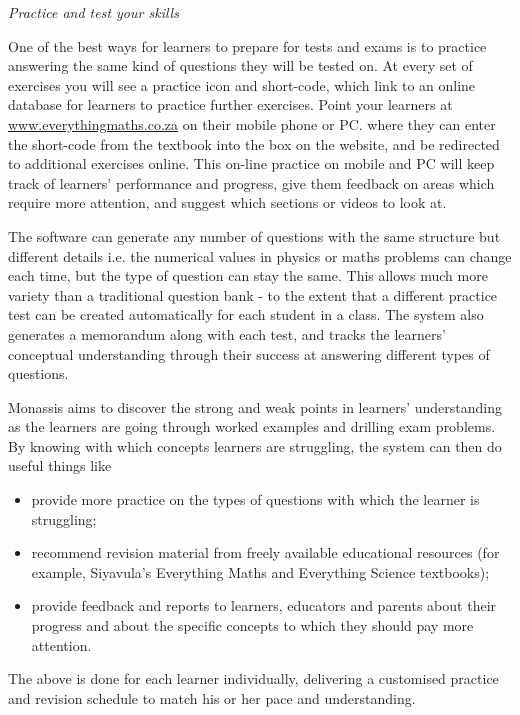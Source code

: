\newpage
\thispagestyle{empty}
{\Large


{\normalfont\sffamily\fontsize{22}\normalfont\itshape Practice and test your skills} \par

One of the best ways for learners to prepare for tests and exams is to practice answering the same kind of questions they will be tested on. At every set of exercises you will see a practice icon and short-code, which link to an online database for learners to practice further exercises. Point your learners at \underline{www.everythingmaths.co.za} on their mobile phone or PC. where they can enter the short-code from the textbook into the box on the website, and be redirected to additional exercises online. This on-line practice on mobile and PC will keep track of learners' performance and progress, give them feedback on areas which require more attention, and suggest which sections or videos to look at.\par

The software can generate any number of questions with the same structure but different details i.e. the numerical values in physics or maths problems can change each time, but the type of question can stay the same. This allows much more variety than a traditional question bank - to the extent that a different practice test can be created automatically for each student in a class. The system also generates a memorandum along with each test, and tracks the learners' conceptual understanding through their success at answering different types of questions.\par
Monassis aims to discover the strong and weak points in learners' understanding as the learners are going through worked examples and drilling exam problems. By knowing with which concepts learners are struggling, the system can then do useful things like
\begin{itemize}[noitemsep]
\item provide more practice on the types of questions with which the learner is struggling;
\item recommend revision material from freely available educational resources (for example,  Siyavula's Everything Maths and Everything Science textbooks);
\item provide feedback and reports to learners, educators and parents about their progress and about the specific concepts to which they should pay more attention.
\end{itemize}
 The above is done for each learner individually, delivering a customised practice and revision schedule to match his or her pace and understanding.


}
